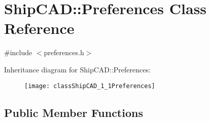 \hypertarget{classShipCAD_1_1Preferences}{}\section{Ship\+C\+AD\+:\+:Preferences Class Reference}
\label{classShipCAD_1_1Preferences}


{\ttfamily \#include $<$preferences.\+h$>$}

Inheritance diagram for Ship\+C\+AD\+:\+:Preferences\+:\begin{figure}[H]
\begin{center}
\leavevmode
\texttt{[image: classShipCAD\_1\_1Preferences]}
\end{center}
\end{figure}
\subsection*{Public Member Functions}
